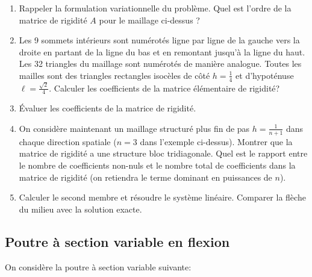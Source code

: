 \documentclass{article}
\begin{document}
\begin{enumerate}
\item Rappeler la formulation variationnelle du problème. Quel est l'ordre de la matrice de rigidité $A$ pour le maillage ci-dessus ?
\item Les 9 sommets intérieurs sont numérotés ligne par ligne de la gauche vers la droite en partant
de la ligne du bas et en remontant jusqu'à la ligne du haut. Les 32 triangles du maillage sont
numérotés de manière analogue. Toutes les mailles sont des triangles rectangles isocèles de
côté $h =\frac 14$ et d'hypoténuse $\ell=\frac{\sqrt 2}{4}$. Calculer les coefficients de la matrice élémentaire de rigidité?
\item Évaluer les coefficients de la matrice de rigidité.
\item On considère maintenant un maillage structuré plus fin de pas $h =\frac 1{n+1}$ dans chaque direction spatiale ($n = 3$ dans l'exemple ci-dessus). Montrer que la matrice de rigidité a une structure
bloc tridiagonale. Quel est le rapport entre le nombre de coefficients non-nuls et le nombre
total de coefficients dans la matrice de rigidité (on retiendra le terme dominant en puissances
de $n$).
\item Calculer le second membre et résoudre le système linéaire. Comparer la flèche du milieu avec la solution exacte.
\end{enumerate}

\subsection*{Poutre à section variable en flexion}
On considère la poutre à section variable suivante:
\begin{center}
\end{center}
\end{document}
